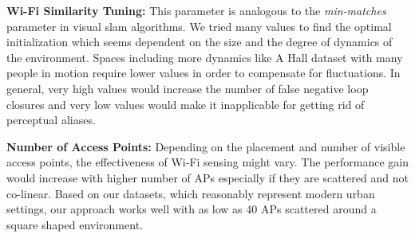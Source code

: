{\bf Wi-Fi Similarity Tuning:} This parameter is analogous to the {\it min-matches} parameter in visual slam algorithms. 
We tried many values to find the optimal initialization which seems dependent on the size and the degree of dynamics of the environment. 
Spaces including more dynamics like A Hall dataset with many people in motion require lower values in order to compensate for fluctuations.
In general, very high values would increase the number of false negative loop closures and very low values would make it inapplicable for getting rid of perceptual aliases.

{\bf Number of Access Points:} Depending on the placement and number of visible access points, the effectiveness of Wi-Fi sensing might vary.
The performance gain would increase with higher number of APs especially if they are scattered and not co-linear. Based on our datasets, which reasonably represent modern urban settings, our approach works well with as low as 40 APs scattered around a square shaped environment.
%

%
 


